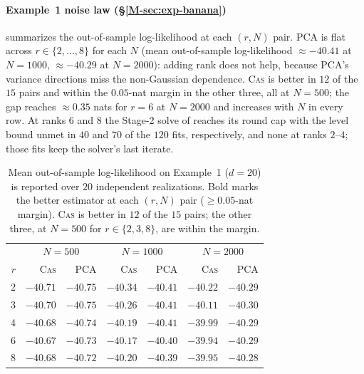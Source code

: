\documentclass[supplement,review,hidelinks,onefignum,onetabnum]{siamart251216}
\begin{document}
\paragraph{Example~1 noise law (\S\ref{M-sec:exp-banana})}  summarizes the out-of-sample log-likelihood at each $(r, N)$ pair. PCA is flat across $r \in \{2, \ldots, 8\}$ for each $N$ (mean out-of-sample log-likelihood $\approx -40.41$ at $N = 1000$, $\approx -40.29$ at $N = 2000$): adding rank does not help, because PCA's variance directions miss the non-Gaussian dependence. \textsc{Cas} is better in $12$ of the $15$ pairs and within the $0.05$-nat margin in the other three, all at $N = 500$; the gap reaches $\approx 0.35$ nats for $r = 6$ at $N = 2000$ and increases with $N$ in every row. At ranks $6$ and $8$ the Stage-2 solve of  reaches its round cap with the level bound unmet in $40$ and $70$ of the $120$ fits, respectively, and none at ranks $2$--$4$; those fits keep the solver's last iterate.

\begin{table}[h]
\centering\footnotesize
\setlength{\tabcolsep}{4pt}
\caption{Mean out-of-sample log-likelihood on Example~1 ($d = 20$) is reported over $20$ independent realizations. Bold marks the better estimator at each $(r, N)$ pair ($\geq 0.05$-nat margin). \textsc{Cas} is better in $12$ of the $15$ pairs; the other three, at $N = 500$ for $r \in \{2, 3, 8\}$, are within the margin.}
\label{tab:pca-banana}
\begin{tabular}{r|rr|rr|rr}
\toprule
& \multicolumn{2}{c|}{$N{=}500$} & \multicolumn{2}{c|}{$N{=}1000$} & \multicolumn{2}{c}{$N{=}2000$} \\
$r$ & \textsc{Cas} & PCA & \textsc{Cas} & PCA & \textsc{Cas} & PCA \\
\midrule
2  & $-40.71$ & $-40.75$ & $\mathbf{-40.34}$ & $-40.41$ & $\mathbf{-40.22}$ & $-40.29$ \\
3  & $-40.70$ & $-40.75$ & $\mathbf{-40.26}$ & $-40.41$ & $\mathbf{-40.11}$ & $-40.30$ \\
4  & $\mathbf{-40.68}$ & $-40.74$ & $\mathbf{-40.19}$ & $-40.41$ & $\mathbf{-39.99}$ & $-40.29$ \\
6  & $\mathbf{-40.67}$ & $-40.73$ & $\mathbf{-40.17}$ & $-40.40$ & $\mathbf{-39.94}$ & $-40.29$ \\
8  & $-40.68$ & $-40.72$ & $\mathbf{-40.20}$ & $-40.39$ & $\mathbf{-39.95}$ & $-40.28$ \\
\bottomrule
\end{tabular}
\end{table}
\end{document}
